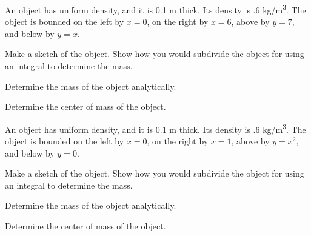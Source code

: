 \begin{problem}

\item An object has uniform density, and it is 0.1 m thick. Its
  density is .6 kg/m\textsuperscript{3}. The object is bounded on the
  left by $x=0$, on the right by $x=6$, above by $y=7$, and below by
  $y=x$.
  \begin{subproblem}
    \item Make a sketch of the object. Show how you would subdivide
      the object for using an integral to determine the mass.
      \vfill
    \item Determine the mass of the object analytically.
      \vfill
    \item Determine the center of mass of the object.
      \vfill
  \end{subproblem}

  \clearpage

\item An object has uniform density, and it is 0.1 m thick. Its
  density is .6 kg/m\textsuperscript{3}. The object is bounded on the
  left by $x=0$, on the right by $x=1$, above by $y=x^2$, and below by
  $y=0$.
  \begin{subproblem}
    \item Make a sketch of the object. Show how you would subdivide
      the object for using an integral to determine the mass.
      \vfill
    \item Determine the mass of the object analytically.
      \vfill
    \item Determine the center of mass of the object.
      \vfill
  \end{subproblem}


\end{problem}

\postClass

